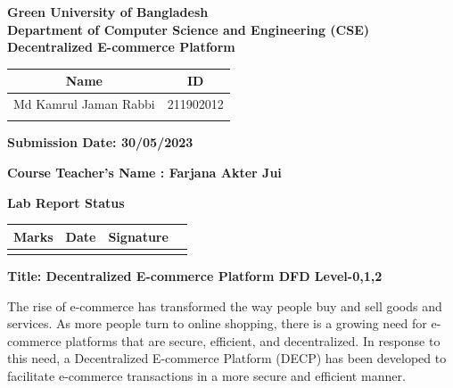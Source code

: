 \documentclass[a4paper,11pt]{article}
\begin{document}
\begin{center}
\begin{center}
\textbf{\normalsize{ Green University of Bangladesh}} \\
\textbf{\normalsize{Department of Computer Science and Engineering (CSE)}}\\[1cm]

\textbf{\LARGE{Decentralized E-commerce Platform}}\\[1cm]

\begin{table}[H]
    \centering
    \begin{tabular}{|c|c|} \hline
       \textbf{Name} &  \textbf{ID} \\ \hline
       Md Kamrul Jaman Rabbi & 211902012  \\ \hline
         &  \\ \hline
       
    \end{tabular}
   
\end{table} 

\vspace{0.5cm}


 
\textbf{\large Submission Date: 30/05/2023}
\vspace{1cm}

\textbf{\large Course Teacher's Name : Farjana Akter Jui}

\begin{center}
\textbf{Lab Report Status}
\end{center}

\begin{table}[h]
\centering
\begin{tabular}{|p{4cm}|p{6cm}|p{4cm}|} \hline
\textbf{Marks} & \textbf{Date}& \textbf{Signature} \\ \hline  
                &              &                     
                   &              &                     \\ \hline


\end{tabular}
\end{table}



\end{center}

\newpage

\begin{center}
 \textbf{\Large Title: Decentralized E-commerce Platform DFD Level-0,1,2}   


 \vspace{1cm}
The rise of e-commerce has transformed the way people buy and sell goods and services. As more people turn to online shopping, there is a growing need for e-commerce platforms that are secure, efficient, and decentralized. In response to this need, a Decentralized E-commerce Platform (DECP) has been developed to facilitate e-commerce transactions in a more secure and efficient manner.


\end{center}
\end{center}
\end{document}
